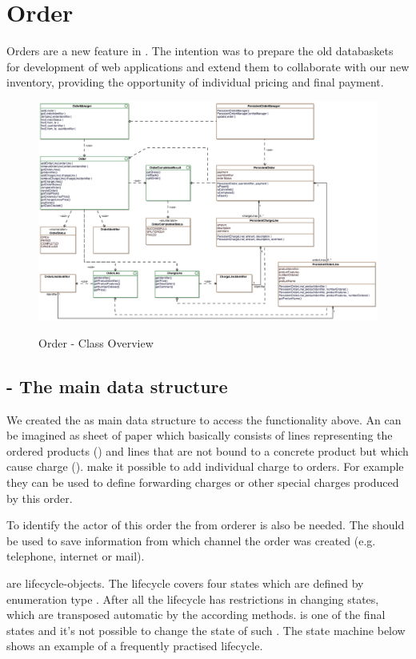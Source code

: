 \newpage
\section{Order}
Orders are a new feature in \salespoint. The intention was to prepare the old databaskets for development of web applications and extend them to collaborate with our new inventory, providing the opportunity of individual pricing and final payment.

\begin{figure}[ht]
	\centering
  \includegraphics[width=1.0\textwidth]{images/Order_Overview.eps}
	\label{order_overview}
	\caption{Order - Class Overview}
\end{figure}

\subsection{ - The main data structure}
We created the  as main data structure to access the functionality above. An  can be imagined as sheet of paper which basically consists of lines representing the ordered products () and lines that are not bound to a concrete product but which cause charge ().  make it possible to add individual charge to orders. For example they can be used to define forwarding charges or other special charges produced by this order.

To identify the actor of this order the  from orderer is also be needed. The  should be used to save information from which channel the order was created (e.g. telephone, internet or mail).

 are lifecycle-objects. The lifecycle covers four states which are defined by enumeration type . After all the lifecycle has restrictions in changing states, which are transposed automatic by the according methods.  is one of the final states and it's not possible to change the state of such . The state machine below shows an example of a frequently practised lifecycle.

